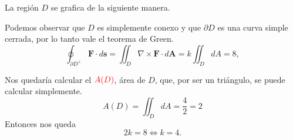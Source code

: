 \begin{solution}
    La regi\'on $D$ se grafica de la siguiente manera.

    \begin{center}
    \end{center}


    Podemos observar que $D$ es simplemente conexo y que $\partial D$ es una curva simple cerrada, por lo tanto vale el teorema de Green.
    \[
    \oint_{\partial D^+} \mathbf{F}\cdot d\mathbf{s}=\iint_D \nabla\times\mathbf{F}\cdot d\mathbf{A}=k\iint_DdA=8,
    \]
 
  Nos quedar\'ia calcular el  $\textcolor{red}{A(D)}$,  \'area de $D$, que, por ser un tri\'angulo, se puede calcular simplemente.
    \[
    A(D) = \iint_D dA=\frac{4}{2}=2
    \]
    Entonces nos queda
    \[
    2k=8\iff k=4.
    \]
\end{solution}